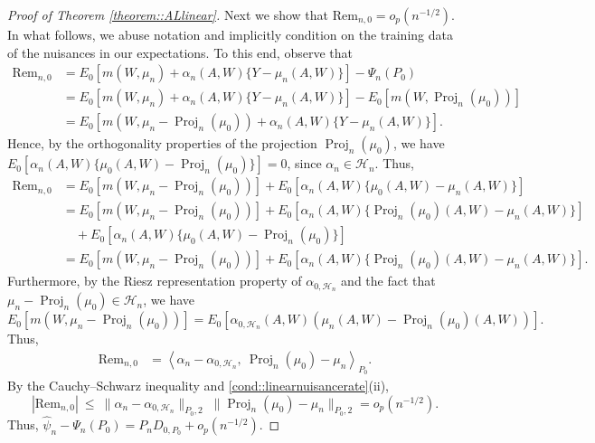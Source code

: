 \documentclass[11pt]{article}
\theoremstyle{definition}
\begin{document}
\begin{proof}[Proof of Theorem \ref{theorem::ALlinear}]
Next we show that $\text{Rem}_{n,0} = o_p(n^{-1/2})$. In what follows, we abuse notation and implicitly condition on the training data of the nuisances in our expectations. To this end, observe that
\begin{align*}
    \text{Rem}_{n,0} &= E_0 \left[m(W, \mu_n) + \alpha_n(A, W)\{Y - \mu_n(A, W)\}\right] - \Psi_n(P_0)  \\
    &= E_0 \left[m(W, \mu_n) + \alpha_n(A, W)\{Y - \mu_n(A, W)\}\right] - E_0 \left[m(W, \operatorname{Proj}_n(\mu_0))\right] \\
     &= E_0 \left[m(W, \mu_n - \operatorname{Proj}_n(\mu_0)) + \alpha_n(A, W)\{Y - \mu_n(A, W)\}\right].
\end{align*}
Hence, by the orthogonality properties of the projection $\operatorname{Proj}_n(\mu_0)$, we have $E_0 \left[\alpha_n(A, W)\{\mu_0(A,W) -  \operatorname{Proj}_n(\mu_0)\}\right] = 0$, since $\alpha_n \in \mathcal{H}_n$. Thus, 
\begin{align*}
    \text{Rem}_{n,0}  &= E_0 \left[m(W, \mu_n - \operatorname{Proj}_n(\mu_0))\right] + E_0 \left[\alpha_n(A, W)\{\mu_0(A,W) - \mu_n(A, W)\}\right]\\
&= E_0 \left[m(W, \mu_n - \operatorname{Proj}_n(\mu_0))\right] + E_0 \left[\alpha_n(A, W)\{\operatorname{Proj}_n(\mu_0)(A,W) - \mu_n(A, W)\}\right] \\
&\quad + E_0 \left[\alpha_n(A, W)\{\mu_0(A,W) -  \operatorname{Proj}_n(\mu_0)\}\right] \\
&= E_0 \left[m(W, \mu_n - \operatorname{Proj}_n(\mu_0))\right] + E_0 \left[\alpha_n(A, W)\{\operatorname{Proj}_n(\mu_0)(A,W) - \mu_n(A, W)\}\right].
\end{align*}
Furthermore, by the Riesz representation property of $\alpha_{0, \mathcal{H}_n}$ and the fact that $\mu_n - \operatorname{Proj}_n(\mu_0) \in \mathcal{H}_n$, we have
\[
E_0 \left[m(W, \mu_n - \operatorname{Proj}_n(\mu_0))\right] =  E_0 \left[\alpha_{0, \mathcal{H}_n}(A,W)(\mu_n(A,W) - \operatorname{Proj}_n(\mu_0)(A,W))\right].
\]
Thus,
\begin{align*}
    \text{Rem}_{n,0}
      &=  \left\langle \alpha_n - \alpha_{0,\mathcal{H}_n},\ \operatorname{Proj}_n(\mu_0) - \mu_n \right\rangle_{P_0}.
\end{align*}
By the Cauchy--Schwarz inequality and \ref{cond::linearnuisancerate}(ii),
\[
\left|\text{Rem}_{n,0}\right|
\ \le\
\|\alpha_n - \alpha_{0,\mathcal{H}_n}\|_{P_0,2}\;
\|\operatorname{Proj}_n(\mu_0) - \mu_n\|_{P_0,2} = o_p(n^{-1/2}).
\]
Thus,  $\widehat{\psi}_n  - \Psi_n(P_0) =  P_n D_{0, P_0} + o_p(n^{-1/2}) $.



\end{proof}
\end{document}

